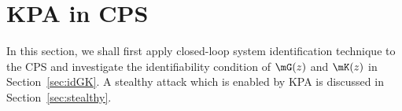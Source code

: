 \section{KPA in CPS}\label{sec:sysid}
In this section, we shall first apply closed-loop system identification technique to the CPS and investigate the identifiability condition of $\mG(z)$ and $\mK(z)$ in Section~\ref{sec:idGK}. A stealthy attack which is enabled by KPA is discussed in Section~\ref{sec:stealthy}.

